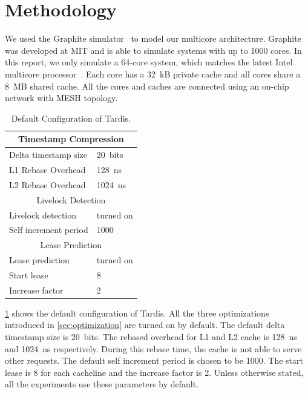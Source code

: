 \documentclass[12pt]{article}
\begin{document}
\section{Methodology}

We used the Graphite simulator~\cite{graphite} to model our multicore 
architecture. Graphite was developed at MIT and is able to simulate 
systems with up to 1000 cores. In this report, we only simulate a 
64-core system, which matches the latest Intel multicore 
processor~\cite{xeonphi}. Each core has a 32~kB private cache and all 
cores share a 8~MB shared cache. All the cores and caches are 
connected using an on-chip network with MESH topology.

\begin{table}
	\caption{ Default Configuration of Tardis. }
	\begin{center}
	{ 
		\begin{tabular}{|l|l|}
            \hline
			\multicolumn{2}{|c|}{Timestamp Compression} \\
			\hline
			Delta timestamp size 		& 20~bits \\
			L1 Rebase Overhead 			& 128~ns\\
			L2 Rebase Overhead			& 1024~ns \\
			\hline
			\multicolumn{2}{|c|}{Livelock Detection} \\
			\hline
			Livelock detection 			& turned on \\
			Self increment period 		& 1000 \\
			\hline
			\multicolumn{2}{|c|}{Lease Prediction} \\
			\hline
			Lease prediction			& turned on \\
			Start lease 				& 8 \\
			Increase factor				& 2 \\
			\hline
		\end{tabular}
    }
	\end{center}
    \label{tab:system}
	\vspace{-.2in}
\end{table}

\cref{tab:system} shows the default configuration of Tardis. All the 
three optimizations introduced in \cref{sec:optimization} are turned 
on by default. The default delta timestamp size is 20~bits. The 
rebased overhead for L1 and L2 cache is 128~ns and 1024~ns 
respectively. During this rebase time, the cache is not able to serve 
other requests. The default self increment period is chosen to be 
1000. The start lease is 8 for each cacheline and the increase factor 
is 2. Unless otherwise stated, all the experiments use these 
parameters by default.
\end{document}
